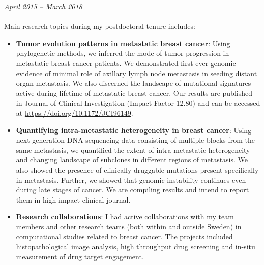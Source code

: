 \documentclass[margin, 10pt]{res} %
\begin{document}
\begin{resume}
{\sl \textbf{}} \hfill \textit{April 2015 -- March 2018} \\
{\color{RubineRed}{Karolinska University Hospital, Stockholm, Sweden}} \\
Main research topics during my postdoctoral tenure includes:
\begin{itemize}
\item \textbf{Tumor evolution patterns in metastatic breast cancer}: Using phylogenetic methods, we inferred the mode of tumor progression in metastatic breast cancer patients. We demonstrated first ever genomic evidence of minimal role of axillary lymph node metastasis in seeding distant organ metastasis. We also discerned the landscape of mutational signatures active during lifetime of metastatic breast cancer. Our results are published in Journal of Clinical Investigation (Impact Factor 12.80) and can be accessed at \href{https://doi.org/10.1172/JCI96149}{https://doi.org/10.1172/JCI96149}.
\item \textbf{Quantifying intra-metastatic heterogeneity in breast cancer}: Using next generation DNA-sequencing data consisting of multiple blocks from the same metastasis, we quantified the extent of intra-metastatic heterogeneity and changing landscape of subclones in different regions of metastasis. We also showed the presence of clinically druggable mutations present specifically in metastasis. Further, we showed that genomic instability continues even during late stages of cancer. We are compiling results and intend to report them in high-impact clinical journal.
\item \textbf{Research collaborations}: I had active collaborations with my team members and other research teams (both within and outside Sweden) in computational studies related to breast cancer. The projects included histopathological image analysis, high throughput drug screening and in-situ measurement of drug target engagement.
\end{itemize}


\end{resume}
\end{document}
